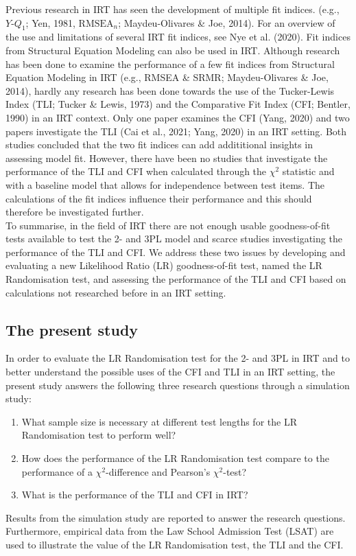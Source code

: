 \documentclass[Royal,sageapa,times,doublespace]{sagej}
\begin{document}
\indent Previous research in IRT has seen the development of multiple fit indices. (e.g., $Y\text{-}Q_1$; Yen, 1981, $\text{RMSEA}_n$; Maydeu-Olivares \& Joe, 2014). For an overview of the use and limitations of several IRT fit indices, see Nye et al. (2020). Fit indices from Structural Equation Modeling can also be used in IRT. Although research has been done to examine the performance of a few fit indices from Structural Equation Modeling in IRT (e.g., RMSEA \& SRMR; Maydeu-Olivares \& Joe, 2014), hardly any research has been done towards the use of the Tucker-Lewis Index (TLI; Tucker \& Lewis, 1973) and the Comparative Fit Index (CFI; Bentler, 1990) in an IRT context. Only one paper examines the CFI (Yang, 2020) and two papers investigate the TLI (Cai et al., 2021; Yang, 2020) in an IRT setting. Both studies concluded that the two fit indices can add addititional insights in assessing model fit. However, there have been no studies that investigate the performance of the TLI and CFI when calculated through the $\chi^2$ statistic and with a baseline model that allows for independence between test items. The calculations of the fit indices influence their performance and this should therefore be investigated further. \\
\indent To summarise, in the field of IRT there are not enough usable goodness-of-fit tests available to test the 2- and 3PL model and scarce studies investigating the performance of the TLI and CFI. We address these two issues by developing and evaluating a new Likelihood Ratio (LR) goodness-of-fit test, named the LR Randomisation test, and assessing the performance of the TLI and CFI based on calculations not researched before in an IRT setting.  

\subsection{The present study}
In order to evaluate the LR Randomisation test for the 2- and 3PL in IRT and to better understand the possible uses of the CFI and TLI in an IRT setting, the present study answers the following three research questions through a simulation study:
\begin{enumerate}
\item{What sample size is necessary at different test lengths for the LR Randomisation test to perform well?}
\item{How does the performance of the LR Randomisation test compare to the performance of a $\chi^2$-difference and Pearson's $\chi^2$-test?}
\item{What is the performance of the TLI and CFI in IRT?}
\end{enumerate}
Results from the simulation study are reported to answer the research questions. Furthermore, empirical data from the Law School Admission Test (LSAT) are used to illustrate the value of the LR Randomisation test, the TLI and the CFI.
\end{document}
